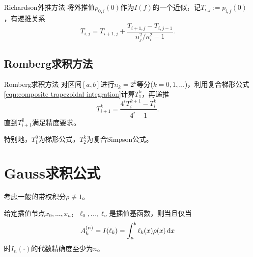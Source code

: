 \begin{theorem}
    {Richardson外推方法}{}
    将外推值$p_{0,i}(0)$作为$I(f)$的一个近似，记$T_{i,j} := p_{i,j}(0)$，有递推关系
    \begin{equation}
        \label{eqn:Richardson}
        T_{i,j} = T_{i+1,j} + \frac{T_{i+1,j} - T_{i,j-1}}{n_j^2/n_i^2 - 1}.
    \end{equation}
\end{theorem}

\subsection{Romberg求积方法}

\begin{theorem}
    {Romberg求积方法}{}
    对区间$[a,b]$进行$n_k = 2^k$等分($k = 0,1,\ldots$)，利用复合梯形公式\eqref{eqn:composite trapezoidal integration}计算$T_1^k$，再递推
    \begin{equation}
        T_{i+1}^k = \frac{4^iT_i^{k+1} - T_i^k}{4^i - 1}.
    \end{equation}
    直到$T_{i+1}^0$满足精度要求。
\end{theorem}

特别地，$T_1^0$为梯形公式，$T_2^k$为复合Simpson公式。




\section{Gauss求积公式}
\label{sec:Gauss-type quadrature rules}

考虑一般的带权积分$\rho\not \equiv 1$。

\begin{theorem}
    {}{}
    给定插值节点$x_0,\ldots,x_n$，$\ell_0,\ldots,\ell_n$是插值基函数，则当且仅当
    \begin{equation}\label{eq:na-interpolatory-weights}
        A_k^{(n)} = I(\ell_k) = \int_a^b\ell_k(x)\rho(x)\mathop{}\!\mathrm{d} x
    \end{equation}
    时$I_n(\cdot)$的代数精确度至少为$n$。
\end{theorem}

